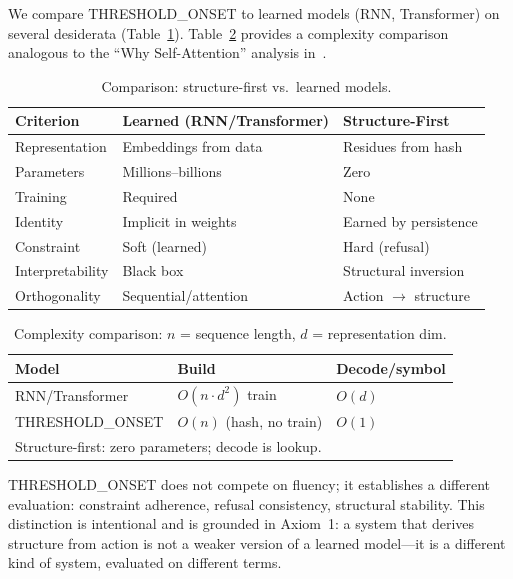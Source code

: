 \documentclass[10pt]{article}
\begin{document}
We compare THRESHOLD\_ONSET to learned models (RNN, Transformer) on several desiderata
(Table~\ref{tab:compare}). Table~\ref{tab:complexity} provides a complexity comparison
analogous to the ``Why Self-Attention'' analysis in~\cite{vaswani2017attention}.

\begin{table}[t]
\centering
\caption{Comparison: structure-first vs.\ learned models.}
\label{tab:compare}
\begin{tabular}{lll}
\toprule
\textbf{Criterion} & \textbf{Learned (RNN/Transformer)} & \textbf{Structure-First} \\
\midrule
Representation & Embeddings from data & Residues from hash \\
Parameters & Millions--billions & Zero \\
Training & Required & None \\
Identity & Implicit in weights & Earned by persistence \\
Constraint & Soft (learned) & Hard (refusal) \\
Interpretability & Black box & Structural inversion \\
\midrule
Orthogonality & Sequential/attention & Action $\rightarrow$ structure \\
\bottomrule
\end{tabular}
\end{table}

\begin{table}[t]
\centering
\caption{Complexity comparison: $n$ = sequence length, $d$ = representation dim.}
\label{tab:complexity}
\begin{tabular}{lll}
\toprule
\textbf{Model} & \textbf{Build} & \textbf{Decode/symbol} \\
\midrule
RNN/Transformer & $O(n \cdot d^2)$ train & $O(d)$ \\
THRESHOLD\_ONSET & $O(n)$ (hash, no train) & $O(1)$ \\
\midrule
\multicolumn{3}{l}{\footnotesize Structure-first: zero parameters; decode is lookup.} \\
\bottomrule
\end{tabular}
\end{table}

THRESHOLD\_ONSET does not compete on fluency; it establishes a different evaluation:
constraint adherence, refusal consistency, structural stability. This distinction is
intentional and is grounded in Axiom~1: a system that derives structure from action
is not a weaker version of a learned model---it is a different kind of system, evaluated
on different terms.
\end{document}
